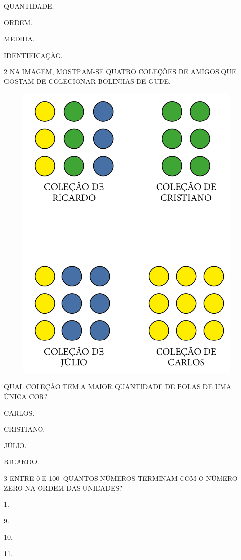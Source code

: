 \begin{escolha}
\item
  QUANTIDADE.
\item
  ORDEM.
\item
  MEDIDA.
\item
  IDENTIFICAÇÃO.
\end{escolha}

\num{2} NA IMAGEM, MOSTRAM-SE QUATRO COLEÇÕES DE AMIGOS QUE GOSTAM DE COLECIONAR
BOLINHAS DE GUDE.

\begin{figure}[htpb!]
\centering
\includegraphics[width=.5\textwidth]{../ilustracoes/MAT1/SAEB_1ANO_MAT_FIGURA16.png}
\end{figure}

\pagebreak
\noindent{}QUAL COLEÇÃO TEM A MAIOR QUANTIDADE DE BOLAS DE UMA ÚNICA COR?

\begin{escolha}
\item
  CARLOS.
\item
  CRISTIANO.
\item
  JÚLIO.
\item
  RICARDO.
\end{escolha}

\num{3} ENTRE 0 E 100, QUANTOS NÚMEROS TERMINAM COM O NÚMERO ZERO NA ORDEM DAS UNIDADES?

\begin{escolha}
\item
  1.
\item
  9.
\item
  10.
\item
  11.
\end{escolha}

